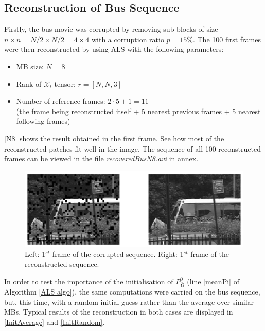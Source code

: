 \documentclass[a4paper, 11pt]{article} %
\def \t {\times}
\def \Xl {\mathcal{X}_{l}}
\def \bO{\bar{\Omega}}
\begin{document}
\subsection{Reconstruction of Bus Sequence}
Firstly, the bus movie was corrupted by removing sub-blocks of size $n\t n=N/2\t N/2=4\t 4$ with a corruption ratio $p=15\%$.
The 100 first frames were then reconstructed by using ALS with the following parameters:
\begin{itemize}
\item MB size: $N=8$
\item Rank of $\Xl$ tensor: $r=[N, N, 3]$
\item Number of reference frames: $2\cdot 5+1=11$    \\ (the frame being reconstructed itself + 5 nearest previous frames + 5 nearest following frames)
\end{itemize}

\autoref{N8} shows the result obtained in the first frame. See how most of the reconstructed patches fit well in the image. The sequence of all 100 reconstructed frames can be viewed in the file \textit{recoveredBusN8.avi} in annex.

\begin{figure}[h!]
\centering
\includegraphics[scale=0.8]{myposter}
\caption{Left: 1$^{st}$ frame of the corrupted sequence. Right: 1$^{st}$ frame of the reconstructed sequence. \label{N8}}
\end{figure}
  
In order to test the importance of the initialisation of $P^0_{\bO}$ (line \ref{meanPi} of Algorithm  \ref{ALS algo}), the same computations were carried on the bus sequence, but, this time, with a random initial guess rather than the average over similar MBs. Typical results of the reconstruction in both cases are displayed in \autoref{InitAverage} and \autoref{InitRandom}.
  
\end{document}
